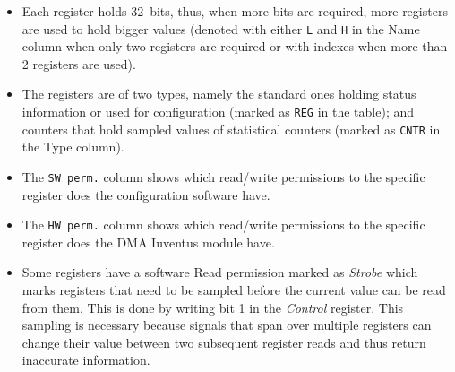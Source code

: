 \begin{itemize}
    \item Each register holds 32~bits, thus, when more bits are required, more registers are used to
    hold bigger values (denoted with either \verb|L| and \verb|H| in the Name column when only two
    registers are required or with indexes when more than 2 registers are used).
    \item The registers are of two types, namely the standard ones holding status information
    or used for configuration (marked as \verb|REG| in the table); and counters that hold sampled
    values of statistical counters (marked as \verb|CNTR| in the Type column).
    \item The \verb|SW perm.| column shows which read/write permissions to the specific register
    does the configuration software have.
    \item The \verb|HW perm.| column shows which read/write permissions to the specific register
    does the DMA Iuventus module have.
    \item Some registers have a software Read permission marked as \emph{Strobe} which marks
    registers that need to be sampled before the current value can be read from them. This is done
    by writing bit 1 in the \emph{Control} register. This sampling is necessary because signals
    that span over multiple registers can change their value between two subsequent register reads
    and thus return inaccurate information.
\end{itemize}

